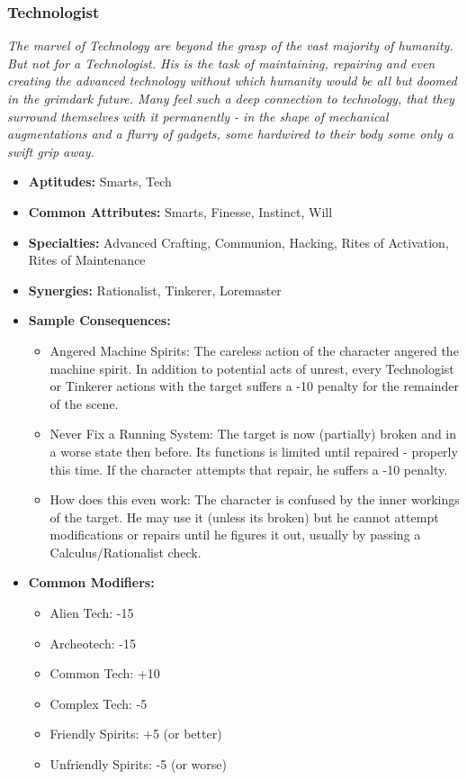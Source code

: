 \subsubsection{Technologist}\label{Technologist}
\textit{The marvel of Technology are beyond the grasp of the vast majority of humanity.
But not for a Technologist.
His is the task of maintaining, repairing and even creating the advanced technology without which humanity would be all but doomed in the grimdark future.
Many feel such a deep connection to technology, that they surround themselves with it permanently - in the shape of mechanical augmentations and a flurry of gadgets, some hardwired to their body some only a swift grip away.}
\begin{itemize}
	\item \textbf{Aptitudes:} Smarts, Tech
	\item \textbf{Common Attributes:} Smarts, Finesse, Instinct, Will 
	\item \textbf{Specialties:} Advanced Crafting, Communion, Hacking, Rites of Activation, Rites of Maintenance
	\item \textbf{Synergies:} Rationalist, Tinkerer, Loremaster
	\item \textbf{Sample Consequences:} 
	\begin{itemize}
		\item Angered Machine Spirits: The careless action of the character angered the machine spirit. In addition to potential acts of unrest, every Technologist or Tinkerer actions with the target suffers a -10 penalty for the remainder of the scene.
		\item Never Fix a Running System: The target is now (partially) broken and in a worse state then before. Its functions is limited until repaired - properly this time. If the character attempts that repair, he suffers a -10 penalty.
		\item How does this even work: The character is confused by the inner workings of the target. He may use it (unless its broken) but he cannot attempt modifications or repairs until he figures it out, usually by passing a Calculus/Rationalist check.
	\end{itemize}
	\item \textbf{Common Modifiers:}
	\begin{itemize}
		\item Alien Tech: -15
		\item Archeotech: -15
		\item Common Tech: +10
		\item Complex Tech: -5
		\item Friendly Spirits: +5 (or better)
		\item Unfriendly Spirits: -5 (or worse)
	\end{itemize}
\end{itemize}

